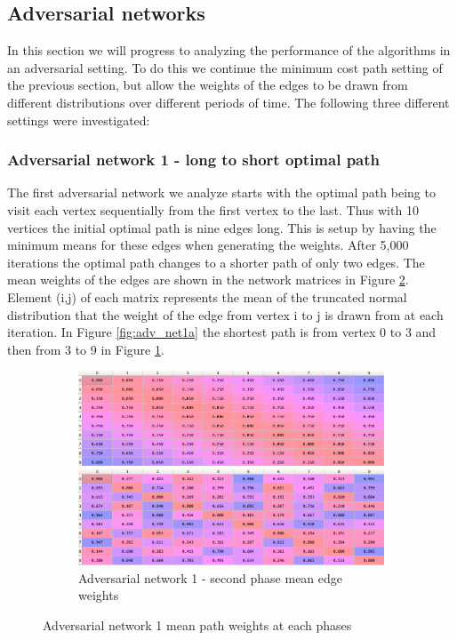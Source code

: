 \subsection{Adversarial networks}

In this section we will progress to analyzing the performance of the algorithms in an adversarial setting. To do this we continue the minimum cost path setting of the previous section, but allow the weights of the edges to be drawn from different distributions over different periods of time. The following three different settings were investigated:\\

\subsubsection{Adversarial network 1 - long to short optimal path}

The first adversarial network we analyze starts with the optimal path being to visit each vertex sequentially from the first vertex to the last. Thus with 10 vertices the initial optimal path is nine edges long. This is setup by having the minimum means for these edges when generating the weights. After 5,000 iterations the optimal path changes to a shorter path of only two edges. The mean weights of the edges are shown in the network matrices in Figure \ref{fig:adv_net1}. Element (i,j) of each matrix represents the mean of the truncated normal distribution that the weight of the edge from vertex i to j is drawn from at each iteration. In Figure \ref{fig:adv_net1a} the shortest path is from vertex 0 to 3 and then from 3 to 9 in Figure \ref{fig:adv_net1b}.\\

\begin{figure}[ht!]
\centering
\begin{subfigure}{1.0\textwidth}
  \centering
  \includegraphics[width=14cm]{../plots/path_means1.png}
  \caption{Adversarial network 1 - initial mean edge weights}
  \label{fig:adv_net1a}
  \includegraphics[width=14cm]{../plots/path_means2.png}
  \caption{Adversarial network 1 - second phase mean edge weights}
  \label{fig:adv_net1b}
\end{subfigure}
\caption{Adversarial network 1 mean path weights at each phases}
\label{fig:adv_net1}
\end{figure}



